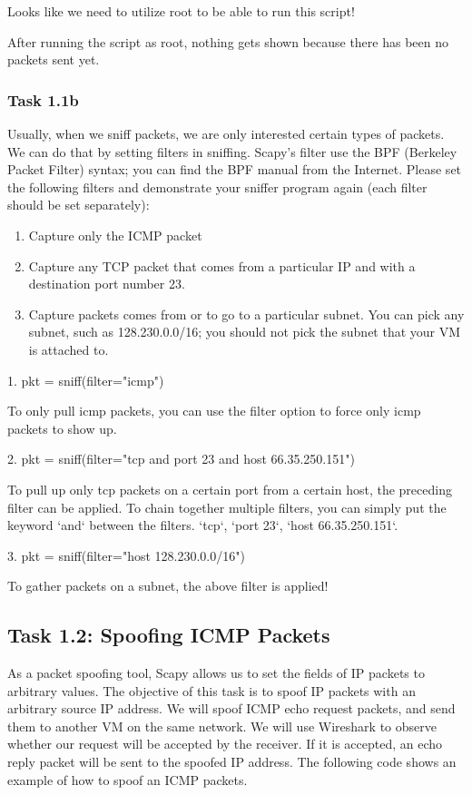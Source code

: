 \documentclass[12pt]{article}
\newcommand\tab[1][0.5cm]{\hspace*{#1}}
\begin{document}
Looks like we need to utilize root to be able to run this script!

After running the script as root, nothing gets shown because there has been no packets sent yet.

\subsubsection{Task 1.1b}
\tab Usually, when we sniff packets, we are only interested certain types of packets. We can do
that by setting filters in sniffing. Scapy’s filter use the BPF (Berkeley Packet Filter) syntax; you can find the
BPF manual from the Internet. Please set the following filters and demonstrate your sniffer program again
(each filter should be set separately):
\begin{enumerate}
	\item Capture only the ICMP packet
	\item Capture any TCP packet that comes from a particular IP and with a destination port number 23.
	\item Capture packets comes from or to go to a particular subnet. You can pick any subnet, such as
	128.230.0.0/16; you should not pick the subnet that your VM is attached to.
\end{enumerate}

1. pkt = sniff(filter="icmp")

To only pull icmp packets, you can use the filter option to force only icmp packets to show up.

2. pkt = sniff(filter="tcp and port 23 and host 66.35.250.151")

To pull up only tcp packets on a certain port from a certain host, the preceding filter can be applied. To chain together multiple filters, you can simply put the keyword `and` between the filters. `tcp`, `port 23`, `host 66.35.250.151`.

3. pkt = sniff(filter="host 128.230.0.0/16")

To gather packets on a subnet, the above filter is applied!



\subsection{Task 1.2: Spoofing ICMP Packets}

As a packet spoofing tool, Scapy allows us to set the fields of IP packets to arbitrary values. The objective
of this task is to spoof IP packets with an arbitrary source IP address. We will spoof ICMP echo request
packets, and send them to another VM on the same network. We will use Wireshark to observe whether our
request will be accepted by the receiver. If it is accepted, an echo reply packet will be sent to the spoofed IP
address. The following code shows an example of how to spoof an ICMP packets.
\end{document}
